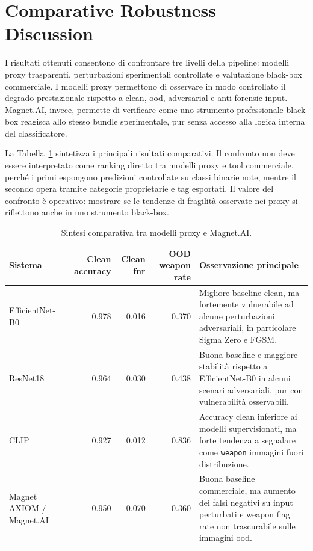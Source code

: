 \section{Comparative Robustness Discussion}
\label{sec:results-comparative}

I risultati ottenuti consentono di confrontare tre livelli della pipeline:
modelli proxy trasparenti, perturbazioni sperimentali controllate e valutazione
black-box commerciale. I modelli proxy permettono di osservare in modo
controllato il degrado prestazionale rispetto a clean, \gls{ood}, adversarial e
anti-forensic input. Magnet.AI, invece, permette di verificare come uno strumento
professionale black-box reagisca allo stesso bundle sperimentale, pur senza
accesso alla logica interna del classificatore.

La Tabella~\ref{tab:results-comparative-summary} sintetizza i principali
risultati comparativi. Il confronto non deve essere interpretato come ranking
diretto tra modelli proxy e tool commerciale, perché i primi espongono
predizioni controllate su classi binarie note, mentre il secondo opera tramite
categorie proprietarie e tag esportati. Il valore del confronto è operativo:
mostrare se le tendenze di fragilità osservate nei proxy si riflettono anche in
uno strumento black-box.

\begin{table}[H]
\centering
\caption{Sintesi comparativa tra modelli proxy e Magnet.AI.}
\label{tab:results-comparative-summary}
\small
\begin{tabularx}{\textwidth}{@{}p{1.7cm} r r r X@{}}
\toprule
\textbf{Sistema} &
\textbf{Clean accuracy} &
\textbf{Clean \gls{fnr}} &
\textbf{OOD weapon rate} &
\textbf{Osservazione principale} \\
\midrule

EfficientNet-B0 &
0.978 &
0.016 &
0.370 &
Migliore baseline clean, ma fortemente vulnerabile ad alcune perturbazioni
adversariali, in particolare Sigma Zero e FGSM. \\

ResNet18 &
0.964 &
0.030 &
0.438 &
Buona baseline e maggiore stabilità rispetto a EfficientNet-B0 in alcuni
scenari adversariali, pur con vulnerabilità osservabili. \\

CLIP &
0.927 &
0.012 &
0.836 &
Accuracy clean inferiore ai modelli supervisionati, ma forte tendenza a
segnalare come \texttt{weapon} immagini fuori distribuzione. \\

Magnet AXIOM / Magnet.AI &
0.950 &
0.070 &
0.360 &
Buona baseline commerciale, ma aumento dei falsi negativi su input perturbati e
weapon flag rate non trascurabile sulle immagini \gls{ood}. \\

\bottomrule
\end{tabularx}
\end{table}

